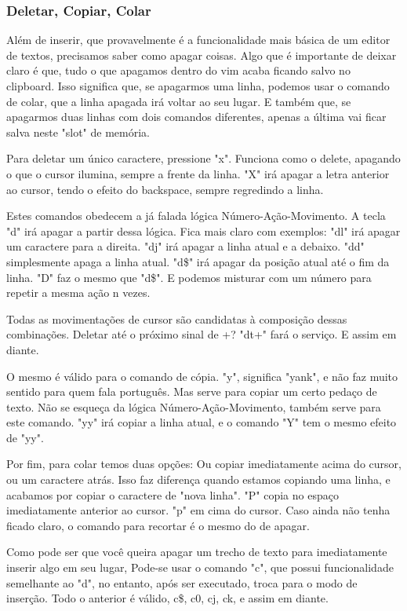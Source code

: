 \documentclass[a4paper, 12pt]{article}
\begin{document}
\subsubsection{Deletar, Copiar, Colar}
Além de inserir, que provavelmente é a funcionalidade mais básica de um editor de textos, precisamos saber como apagar coisas.
Algo que é importante de deixar claro é que, tudo o que apagamos dentro do vim acaba ficando salvo no clipboard.
Isso significa que, se apagarmos uma linha, podemos usar o comando de colar, que a linha apagada irá voltar ao seu lugar.
E também que, se apagarmos duas linhas com dois comandos diferentes, apenas a última vai ficar salva neste "slot" de memória.

Para deletar um único caractere, pressione "x". Funciona como o delete, apagando o que o cursor ilumina, sempre a frente da linha.
"X" irá apagar a letra anterior ao cursor, tendo o efeito do backspace, sempre regredindo a linha.

Estes comandos obedecem a já falada lógica Número-Ação-Movimento.
A tecla "d" irá apagar a partir dessa lógica.
Fica mais claro com exemplos: "dl" irá apagar um caractere para a direita.
"dj" irá apagar a linha atual e a debaixo.
"dd" simplesmente apaga a linha atual.
"d\$" irá apagar da posição atual até o fim da linha.
"D" faz o mesmo que "d\$".
E podemos misturar com um número para repetir a mesma ação n vezes.

Todas as movimentações de cursor são candidatas à composição dessas combinações.
Deletar até o próximo sinal de +? "dt+" fará o serviço.
E assim em diante.

O mesmo é válido para o comando de cópia.
"y", significa "yank", e não faz muito sentido para quem fala português. 
Mas serve para copiar um certo pedaço de texto.
Não se esqueça da lógica Número-Ação-Movimento, também serve para este comando.
"yy" irá copiar a linha atual, e o comando "Y" tem o mesmo efeito de "yy".

Por fim, para colar temos duas opções: Ou copiar imediatamente acima do cursor, ou um caractere atrás.
Isso faz diferença quando estamos copiando uma linha, e acabamos por copiar o caractere de "nova linha".
"P" copia no espaço imediatamente anterior ao cursor. "p" em cima do cursor.
Caso ainda não tenha ficado claro, o comando para recortar é o mesmo do de apagar.

Como pode ser que você queira apagar um trecho de texto para imediatamente inserir algo em seu lugar,
Pode-se usar o comando "c", que possui funcionalidade semelhante ao "d", no entanto, após ser executado, troca para o modo de inserção. Todo o anterior é válido, c\$, c0, cj, ck, e assim em diante.
\end{document}
